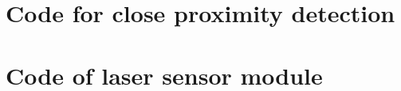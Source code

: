 \section{Code for close proximity detection}\label{code:proximity-full}


\clearpage

\section{Code of laser sensor module}\label{code:laser-full}





